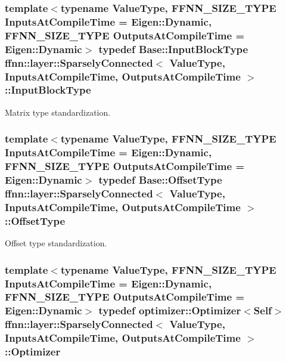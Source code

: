 \hypertarget{classffnn_1_1layer_1_1_sparsely_connected_ad90fd9b4c687e4dc515cf8ca2796043c}{
\subsubsection[{Input\-Block\-Type}]{\setlength{\rightskip}{0pt plus 5cm}template$<$typename Value\-Type, F\-F\-N\-N\-\_\-\-S\-I\-Z\-E\-\_\-\-T\-Y\-P\-E Inputs\-At\-Compile\-Time = Eigen\-::\-Dynamic, F\-F\-N\-N\-\_\-\-S\-I\-Z\-E\-\_\-\-T\-Y\-P\-E Outputs\-At\-Compile\-Time = Eigen\-::\-Dynamic$>$ typedef Base\-::\-Input\-Block\-Type {\bf ffnn\-::layer\-::\-Sparsely\-Connected}$<$ Value\-Type, Inputs\-At\-Compile\-Time, Outputs\-At\-Compile\-Time $>$\-::{\bf Input\-Block\-Type}}}\label{classffnn_1_1layer_1_1_sparsely_connected_ad90fd9b4c687e4dc515cf8ca2796043c}


Matrix type standardization. 

\hypertarget{classffnn_1_1layer_1_1_sparsely_connected_aca8272f02c6417eea3c77dc0cb2bb49e}{
\subsubsection[{Offset\-Type}]{\setlength{\rightskip}{0pt plus 5cm}template$<$typename Value\-Type, F\-F\-N\-N\-\_\-\-S\-I\-Z\-E\-\_\-\-T\-Y\-P\-E Inputs\-At\-Compile\-Time = Eigen\-::\-Dynamic, F\-F\-N\-N\-\_\-\-S\-I\-Z\-E\-\_\-\-T\-Y\-P\-E Outputs\-At\-Compile\-Time = Eigen\-::\-Dynamic$>$ typedef {\bf Base\-::\-Offset\-Type} {\bf ffnn\-::layer\-::\-Sparsely\-Connected}$<$ Value\-Type, Inputs\-At\-Compile\-Time, Outputs\-At\-Compile\-Time $>$\-::{\bf Offset\-Type}}}\label{classffnn_1_1layer_1_1_sparsely_connected_aca8272f02c6417eea3c77dc0cb2bb49e}


Offset type standardization. 

\hypertarget{classffnn_1_1layer_1_1_sparsely_connected_a87466efb64ebf340fa07194c94846ace}{
\subsubsection[{Optimizer}]{\setlength{\rightskip}{0pt plus 5cm}template$<$typename Value\-Type, F\-F\-N\-N\-\_\-\-S\-I\-Z\-E\-\_\-\-T\-Y\-P\-E Inputs\-At\-Compile\-Time = Eigen\-::\-Dynamic, F\-F\-N\-N\-\_\-\-S\-I\-Z\-E\-\_\-\-T\-Y\-P\-E Outputs\-At\-Compile\-Time = Eigen\-::\-Dynamic$>$ typedef {\bf optimizer\-::\-Optimizer}$<${\bf Self}$>$ {\bf ffnn\-::layer\-::\-Sparsely\-Connected}$<$ Value\-Type, Inputs\-At\-Compile\-Time, Outputs\-At\-Compile\-Time $>$\-::{\bf Optimizer}}}\label{classffnn_1_1layer_1_1_sparsely_connected_a87466efb64ebf340fa07194c94846ace}


